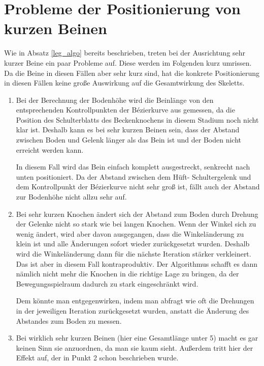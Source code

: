 \section{Probleme der Positionierung von kurzen Beinen}
\label{leg_positioning_short_legs}

Wie in Absatz \ref{leg_algo} bereits beschrieben, treten bei der Ausrichtung sehr kurzer Beine ein paar Probleme auf. Diese werden im Folgenden kurz umrissen. Da die Beine in diesen Fällen aber sehr kurz sind, hat die konkrete Positionierung in diesen Fällen keine große Auswirkung auf die Gesamtwirkung des Skeletts. 

\begin{enumerate}
 \item %
   Bei der Berechnung der Bodenhöhe wird die Beinlänge von den entsprechenden Kontrollpunkten der Bézierkurve aus gemessen, da die Position des Schulterblatts \bzw des Beckenknochens in diesem Stadium noch nicht klar ist. Deshalb kann es bei sehr kurzen Beinen sein, dass der Abstand zwischen Boden und Gelenk länger als das Bein ist und der Boden nicht erreicht werden kann.
   
   In diesem Fall wird das Bein einfach komplett ausgestreckt, senkrecht nach unten positioniert. Da der Abstand zwischen dem Hüft- \bzw Schultergelenk und dem Kontrollpunkt der Bézierkurve nicht sehr groß ist, fällt auch der Abstand zur Bodenhöhe nicht allzu sehr auf.
   
 \item %
   Bei sehr kurzen Knochen ändert sich der Abstand zum Boden durch Drehung der Gelenke nicht so stark wie bei langen Knochen. Wenn der Winkel sich zu wenig ändert, wird aber davon ausgegangen, dass die Winkeländerung zu klein ist und alle Änderungen sofort wieder zurückgesetzt wurden. Deshalb wird die Winkeländerung dann für die nächste Iteration stärker verkleinert. Das ist aber in diesem Fall kontraproduktiv. Der Algorithmus schafft es dann nämlich nicht mehr die Knochen in die richtige Lage zu bringen, da der Bewegungsspielraum dadurch zu stark eingeschränkt wird.
   
   Dem könnte man entgegenwirken, indem man abfragt wie oft die Drehungen in der jeweiligen Iteration zurückgesetzt wurden, anstatt die Änderung des Abstandes zum Boden zu messen.
   
 \item %
   Bei wirklich sehr kurzen Beinen (hier eine Gesamtlänge unter 5) macht es gar keinen Sinn sie anzuordnen, da man sie kaum sieht. Außerdem tritt hier der Effekt auf, der in Punkt 2 schon beschrieben wurde.
   

\end{enumerate}
